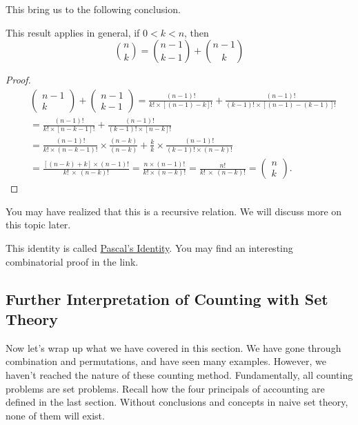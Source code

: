         This bring us to the following conclusion.
        \begin{corollary}\label{pascal's identity}
            This result applies in general, if $0<k<n$, then
            $$\binom{n}{k} = \binom{n-1}{k-1} + \binom{n-1}{k}$$
        \end{corollary}
        \begin{proof}
            $$
                \begin{aligned}
                &\begin{pmatrix}n-1\\k\end{pmatrix}+\begin{pmatrix}n-1\\k-1\end{pmatrix}=\frac{(n-1)!}{k!\times[(n-1)-k]!}+\frac{(n-1)!}{(k-1)!\times[(n-1)-(k-1)]!} \\
                &=\frac{(n-1)!}{k!\times[n-k-1]!}+\frac{(n-1)!}{(k-1)!\times[n-k]!}\\
                &=\frac{(n-1)!}{k!\times(n-k-1)!}\times\frac{(n-k)}{(n-k)}+\frac{k}{k}\times\frac{(n-1)!}{(k-1)!\times(n-k)!}\quad\\
                &=\frac{[(n-k)+k]\times(n-1)!}{k!\:\times\:(n-k)!}=\frac{n\times(n-1)!}{k!\times(n-k)!}=\frac{n!}{k!\:\times\:(n-k)!}=\left(\begin{array}{c}n\\k\end{array}\right).
                \end{aligned}
            $$
        \end{proof}
        You may have realized that this is a recursive relation. We will discuss more on this topic later.
        \begin{remark}
            This identity is called  
            \href{https://artofproblemsolving.com/wiki/index.php/Pascal%27s_Identity#:~:text=Pascal's%20Identity%20is%20a%20useful,Formula%2C%20and%20occasionally%20Pascal's%20Theorem.}{Pascal's Identity}.
            You may find an interesting combinatorial proof in the link.
        \end{remark}

        \subsection{Further Interpretation of Counting with Set Theory}
        Now let's wrap up what we have covered in this section. We have gone through combination and permutations, and have seen many examples. However, we haven't reached
        the nature of these counting method. Fundamentally, all counting problems are set problems. Recall how the four principals of accounting are defined in the last section. Without
        conclusions and concepts in naive set theory, none of them will exist. 

